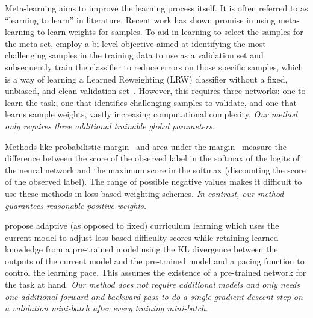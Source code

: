 \documentclass{article}
\theoremstyle{plain}
\theoremstyle{definition}
\theoremstyle{remark}
\begin{document}
Meta-learning aims to improve the learning process itself. It is often referred to as ``learning to learn'' in literature. Recent work has shown promise in using meta-learning to learn weights for samples. %
To aid in learning to select the samples for the meta-set, \citet{jain_improving_2024} employ a bi-level objective aimed at identifying the most challenging samples in the training data to use as a validation set and subsequently train the classifier to reduce errors on those specific samples, which is a way of learning a Learned Reweighting (LRW) classifier without a fixed, unbiased, and clean validation set~\citep{ren_learning_2019}. However, this requires three networks: one to learn the task, one that identifies challenging samples to validate, and one that learns sample weights, vastly increasing computational complexity. \textit{Our method only requires three additional trainable global parameters.}

Methods like probabilistic margin~\citep{wang_probabilistic_2022} and area under the margin~\citep{pleiss_identifying_2020} measure the difference between the score of the observed label in the softmax of the logits of the neural network and the maximum score in the softmax (discounting the score of the observed label). The range of possible negative values makes it difficult to use these methods in loss-based weighting schemes. \textit{In contrast, our method guarantees reasonable positive weights.}

\citet{kong_adaptive_2021} propose adaptive (as opposed to fixed) curriculum learning which uses the current model to adjust loss-based difficulty scores while retaining learned knowledge from a pre-trained model using the KL divergence between the outputs of the current model and the pre-trained model and a pacing function to control the learning pace. This assumes the existence of a pre-trained network for the task at hand. \textit{Our method does not require additional models and only needs one additional forward and backward pass to do a single gradient descent step on a validation mini-batch after every training mini-batch.}
\end{document}
